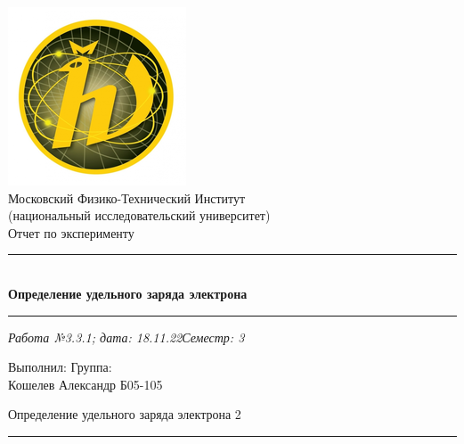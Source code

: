\documentclass[12pt,a4paper]{scrartcl}
\begin{document}
	\begin{titlepage}
		
		\vspace*{\fill}
		
		\begin{center}
			\includegraphics[scale=0.8]{MIPT.png}
			\\[0.7cm]\Huge Московский Физико-Технический Институт\\(национальный исследовательский университет)
			\\[2cm]\LARGE Отчет по эксперименту
			\\[0.5cm]\noindent\rule{\textwidth}{1pt}
			\\\Huge\textbf{Определение удельного заряда электрона}
			\\[-0.5cm]\noindent\rule{\textwidth}{1pt}
		\end{center}
		
		\begin{flushleft}
			\textit{Работа №3.3.1; дата: 18.11.22}\hfill\textit{Семестр: 3}
		\end{flushleft}
		
		\vspace*{\fill}
		
		\begin{flushleft}
			Выполнил: \hspace{\fill} Группа:
			\\Кошелев Александр \hspace{\fill} Б05-105
		\end{flushleft}
	\end{titlepage}
	
	
	\begin{flushleft}
		\footnotesize{Определение удельного заряда электрона} \hspace{\fill} \footnotesize{2}
		\\[-0.3cm]\noindent\rule{\textwidth}{0.3pt}
	\end{flushleft}
	
\end{document}
